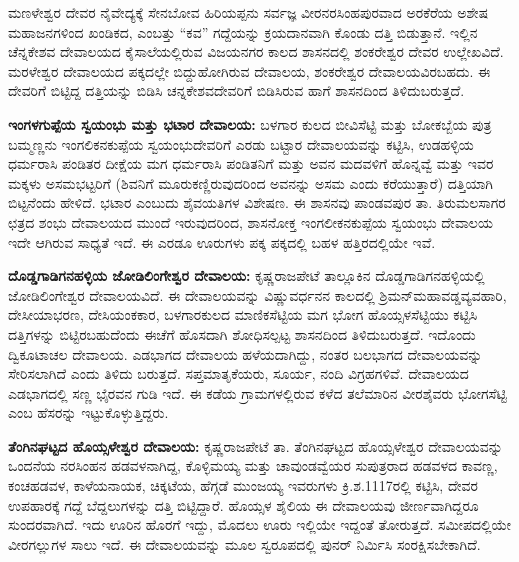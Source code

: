 ಮಣಳೇಶ್ವರ ದೇವರ ನೈವೇದ್ಯಕ್ಕೆ ಸೇನಬೋವ ಹಿರಿಯಪ್ಪನು ಸರ್ವಜ್ಞ ವೀರನರಸಿಂಹಪುರವಾದ ಅರಕೆರೆಯ ಅಶೇಷ ಮಹಾಜನಗಳಿಂದ ಖಂಡಿಕದ, ಎಂಬತ್ತು “ಕವ” ಗದ್ದೆಯನ್ನು ಕ್ರಯದಾನವಾಗಿ ಕೊಂಡು ದತ್ತಿ ಬಿಡುತ್ತಾನೆ. ಇಲ್ಲಿನ ಚೆನ್ನಕೇಶವ ದೇವಾಲಯದ ಕೈಸಾಲೆಯಲ್ಲಿರುವ ವಿಜಯನಗರ ಕಾಲದ ಶಾಸನದಲ್ಲಿ ಶಂಕರೇಶ್ವರ ದೇವರ ಉಲ್ಲೇಖವಿದೆ. ಮರಳೇಶ್ವರ ದೇವಾಲಯದ ಪಕ್ಕದಲ್ಲೇ ಬಿದ್ದುಹೋಗಿರುವ ದೇವಾಲಯ, ಶಂಕರೇಶ್ವರ ದೇವಾಲಯವಿರಬಹದು. ಈ ದೇವರಿಗೆ ಬಿಟ್ಟಿದ್ದ ದತ್ತಿಯನ್ನು ಬಿಡಿಸಿ ಚನ್ನಕೇಶವದೇವರಿಗೆ ಬಿಡಿಸಿರುವ ಹಾಗೆ ಶಾಸನದಿಂದ ತಿಳಿದುಬರುತ್ತದೆ.

\textbf{ಇಂಗಳಗುಪ್ಪೆಯ ಸ್ವಯಂಭು ಮತ್ತು ಭಟಾರ ದೇವಾಲಯ:} ಬಳಗಾರ ಕುಲದ ಬೀವಿಸೆಟ್ಟಿ ಮತ್ತು ಬೋಕಬ್ಬೆಯ ಪುತ್ರ ಬಮ್ಮಣ್ಣನು ಇಂಗಲಿಕನಕುಪ್ಪೆಯ ಸ್ವಯಂಭುದೇವರಿಗೆ ಎರಡು ಬಟ್ಟಾರ ದೇವಾಲಯವನ್ನು ಕಟ್ಟಿಸಿ, ಉಡಹಳ್ಳಿಯ ಧರ್ಮರಾಸಿ ಪಂಡಿತರ ದೀಕ್ಷೆಯ ಮಗ ಧರ್ಮರಾಸಿ ಪಂಡಿತನಿಗೆ ಮತ್ತು ಅವನ ಮದವಳಿಗೆ ಹೊನ್ನವ್ವೆ ಮತ್ತು ಇವರ ಮಕ್ಕಳು ಅಸಮಭಟ್ಟರಿಗೆ (ಶಿವನಿಗೆ ಮೂರುಕಣ್ಣಿರುವುದರಿಂದ ಅವನನ್ನು ಅಸಮ ಎಂದು ಕರೆಯುತ್ತಾರೆ) ದತ್ತಿಯಾಗಿ ಬಿಟ್ಟನೆಂದು ಹೇಳಿದೆ. ಭಟಾರ ಎಂಬುದು ಶೈವಯತಿಗಳ ವಿಶೇಷಣ. ಈ ಶಾಸನವು ಪಾಂಡವಪುರ ತಾ. ತಿರುಮಲಸಾಗರ ಛತ್ರದ ಶಂಭು ದೇವಾಲಯದ ಮುಂದೆ ಇರುವುದರಿಂದ, ಶಾಸನೋಕ್ತ ಇಂಗಲೀಕನಕುಪ್ಪೆಯ ಸ್ವಯಂಭು ದೇವಾಲಯ ಇದೇ ಆಗಿರುವ ಸಾಧ್ಯತೆ ಇದೆ. ಈ ಎರಡೂ ಊರುಗಳು ಪಕ್ಕ ಪಕ್ಕದಲ್ಲಿ ಬಹಳ ಹತ್ತಿರದಲ್ಲಿಯೇ ಇವೆ.

\textbf{ದೊಡ್ಡಗಾಡಿಗನಹಳ್ಳಿಯ ಜೋಡಿಲಿಂಗೇಶ್ವರ ದೇವಾಲಯ:} ಕೃಷ್ಣರಾಜಪೇಟೆ ತಾಲ್ಲೂಕಿನ ದೊಡ್ಡಗಾಡಿಗನಹಳ್ಳಿಯಲ್ಲಿ ಜೋಡಿಲಿಂಗೇಶ್ವರ ದೇವಾಲಯವಿದೆ. ಈ ದೇವಾಲಯವನ್ನು ವಿಷ್ಣುವರ್ಧನನ ಕಾಲದಲ್ಲಿ ಶ್ರಿಮನ್​ ಮಹಾವಡ್ಡವ್ಯವಹಾರಿ, ದೇಸೀಯಾಭರಣ, ದೇಸಿಯಂಕಕಾರ, ಬಳಗಾರಕುಲದ ಮಾಣಿಕಸೆಟ್ಟಿಯ ಮಗ ಭೋಗ ಹೊಯ್ಸಳಸೆಟ್ಟಿಯು ಕಟ್ಟಿಸಿ ದತ್ತಿಗಳನ್ನು ಬಿಟ್ಟಿರಬಹುದೆಂದು ಈಚೆಗೆ ಹೊಸದಾಗಿ ಶೋಧಿಸಲ್ಪಟ್ಟ ಶಾಸನದಿಂದ ತಿಳಿದುಬರುತ್ತದೆ. ಇದೊಂದು ದ್ವಿಕೂಟಾಚಲ ದೇವಾಲಯ. ಎಡಭಾಗದ ದೇವಾಲಯ ಹಳೆಯದಾಗಿದ್ದು, ನಂತರ ಬಲಭಾಗದ ದೇವಾಲಯವನ್ನು ಸೇರಿಸಲಾಗಿದೆ ಎಂದು ತಿಳಿದು ಬರುತ್ತದೆ. ಸಪ್ತಮಾತೃಕೆಯರು, ಸೂರ್ಯ, ನಂದಿ ವಿಗ್ರಹಗಳಿವೆ. ದೇವಾಲಯದ ಎಡಭಾಗದಲ್ಲಿ ಸಣ್ಣ ಭೈರವನ ಗುಡಿ ಇದೆ. ಈ ಕಡೆಯ ಗ್ರಾಮಗಳಲ್ಲಿರುವ ಕಳೆದ ತಲೆಮಾರಿನ ವೀರಶೈವರು ಭೋಗಸೆಟ್ಟಿ ಎಂಬ ಹೆಸರನ್ನು ಇಟ್ಟುಕೊಳ್ಳುತ್ತಿದ್ದರು.

\textbf{ತೆಂಗಿನಘಟ್ಟದ ಹೊಯ್ಸಳೇಶ್ವರ ದೇವಾಲಯ:} ಕೃಷ್ಣರಾಜಪೇಟೆ ತಾ. ತೆಂಗಿನಘಟ್ಟದ ಹೊಯ್ಸಳೇಶ್ವರ ದೇವಾಲಯ\-ವನ್ನು ಒಂದನೆಯ ನರಸಿಂಹನ ಹಡವಳನಾಗಿದ್ದ, ಕೊಳ್ಳಿಮಯ್ಯ ಮತ್ತು ಚಾವುಂಡವ್ವೆಯರ ಸುಪುತ್ರರಾದ ಹಡವಳದ ಕಾವಣ್ಣ, ಕಂಚಹಡವಳ, ಕಾಳೆಯನಾಯಕ, ಚಿಕ್ಕಟೆಯ, ಹೆಗ್ಗಡೆ ಮುಂಜಯ್ಯ ಇವರುಗಳು ಕ್ರಿ.ಶ.1117ರಲ್ಲಿ ಕಟ್ಟಿಸಿ, ದೇವರ ಉಪಹಾರಕ್ಕೆ ಗದ್ದೆ ಬೆದ್ದಲುಗಳನ್ನು ದತ್ತಿ ಬಿಟ್ಟಿದ್ದಾರೆ. ಹೊಯ್ಸಳ ಶೈಲಿಯ ಈ ದೇವಾಲಯವು ಜೀರ್ಣವಾಗಿದ್ದರೂ ಸುಂದರವಾಗಿದೆ. ಇದು ಊರಿನ ಹೊರಗೆ ಇದ್ದು, ಮೊದಲು ಊರು ಇಲ್ಲಿಯೇ ಇದ್ದಂತೆ ತೋರುತ್ತದೆ. ಸಮೀಪದಲ್ಲಿಯೇ ವೀರಗಲ್ಲುಗಳ ಸಾಲು ಇದೆ. ಈ ದೇವಾಲಯವನ್ನು ಮೂಲ ಸ್ವರೂಪದಲ್ಲಿ ಪುನರ್ ನಿರ್ಮಿಸಿ ಸಂರಕ್ಷಿಸಬೇಕಾಗಿದೆ.

